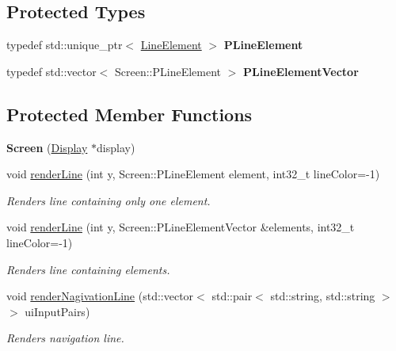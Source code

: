 \subsection*{Protected Types}
\begin{DoxyCompactItemize}
\item 
\mbox{\label{classScreen_a3696376a0036dc304d337dc5e697d6f9}} 
typedef std\+::unique\+\_\+ptr$<$ \mbox{\hyperlink{classScreen_1_1LineElement}{Line\+Element}} $>$ {\bfseries P\+Line\+Element}
\item 
\mbox{\label{classScreen_a62e857d5d7fcfd58fe241c1e933ac3bb}} 
typedef std\+::vector$<$ Screen\+::\+P\+Line\+Element $>$ {\bfseries P\+Line\+Element\+Vector}
\end{DoxyCompactItemize}
\subsection*{Protected Member Functions}
\begin{DoxyCompactItemize}
\item 
\mbox{\label{classScreen_a596e7fffdfafd57fb5385c299863f31d}} 
{\bfseries Screen} (\mbox{\hyperlink{classDisplay}{Display}} $\ast$display)
\item 
void \mbox{\hyperlink{classScreen_a30226bc0c228db9f74f337af86cf34ed}{render\+Line}} (int y, Screen\+::\+P\+Line\+Element element, int32\+\_\+t line\+Color=-\/1)
\begin{DoxyCompactList}\small\item\em Renders line containing only one element. \end{DoxyCompactList}\item 
void \mbox{\hyperlink{classScreen_a21262307ae7898dfa1b27bb0c60247b7}{render\+Line}} (int y, Screen\+::\+P\+Line\+Element\+Vector \&elements, int32\+\_\+t line\+Color=-\/1)
\begin{DoxyCompactList}\small\item\em Renders line containing elements. \end{DoxyCompactList}\item 
void \mbox{\hyperlink{classScreen_a435b179ec61ea7ad8126102a00051b88}{render\+Nagivation\+Line}} (std\+::vector$<$ std\+::pair$<$ std\+::string, std\+::string $>$$>$ ui\+Input\+Pairs)
\begin{DoxyCompactList}\small\item\em Renders navigation line. \end{DoxyCompactList}\end{DoxyCompactItemize}
